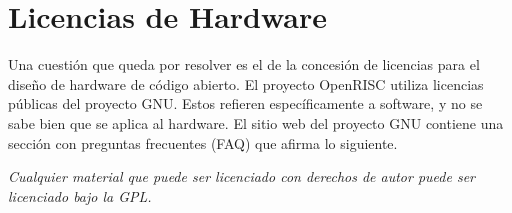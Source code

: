 	

\section{Licencias de Hardware}

Una cuestión que queda por resolver es el de la concesión de licencias para el diseño de hardware de código abierto. El proyecto OpenRISC utiliza licencias públicas del proyecto GNU. Estos refieren específicamente a software, y no se sabe bien que se aplica al hardware.
El sitio web del proyecto GNU contiene una sección con preguntas frecuentes (FAQ)  que afirma lo siguiente.

\textit{Cualquier material que puede ser licenciado con derechos de autor puede ser licenciado bajo la GPL.}

